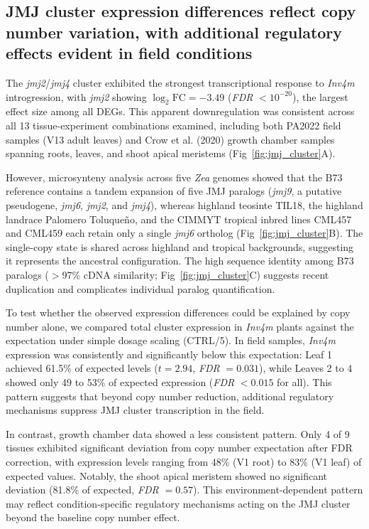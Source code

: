 \documentclass[9pt,twocolumn,twoside]{rilabRxiv}
\newcommand{\invfour}{\textit{Inv4m}\xspace}
\newcommand{\jmjii}{\textit{jmj2}\xspace}
\newcommand{\jmjiv}{\textit{jmj4}\xspace}
\newcommand{\jmjvi}{\textit{jmj6}\xspace}
\newcommand{\jmjix}{\textit{jmj9}\xspace}
\begin{document}
\subsection{JMJ cluster expression differences reflect copy number variation, with additional regulatory effects evident in field conditions}

The \jmjii/\jmjiv cluster exhibited the strongest transcriptional response to \invfour introgression, with \jmjii showing $\log_2 \text{FC} = -3.49$ (\textit{FDR} $< 10^{-20}$), the largest effect size among all DEGs.
This apparent downregulation was consistent across all 13 tissue-experiment combinations examined, including both PA2022 field samples (V13 adult leaves) and Crow et al. (2020) growth chamber samples spanning roots, leaves, and shoot apical meristems (Fig~\ref{fig:jmj_cluster}A).

However, microsynteny analysis across five \textit{Zea} genomes showed that the B73 reference contains a tandem expansion of five JMJ paralogs (\jmjix, a putative pseudogene, \jmjvi, \jmjii, and \jmjiv), whereas highland teosinte TIL18, the highland landrace Palomero Toluque\~{n}o, and the CIMMYT tropical inbred lines CML457 and CML459 each retain only a single \textit{jmj6} ortholog (Fig~\ref{fig:jmj_cluster}B).
The single-copy state is shared across highland and tropical backgrounds, suggesting it represents the ancestral configuration.
The high sequence identity among B73 paralogs ($>$97\% cDNA similarity; Fig~\ref{fig:jmj_cluster}C) suggests recent duplication and complicates individual paralog quantification.

To test whether the observed expression differences could be explained by copy number alone, we compared total cluster expression in \invfour plants against the expectation under simple dosage scaling (CTRL/5).
In field samples, \invfour expression was consistently and significantly below this expectation: Leaf 1 achieved 61.5\% of expected levels ($t = 2.94$, \textit{FDR} $= 0.031$), while Leaves 2 to 4 showed only 49 to 53\% of expected expression (\textit{FDR} $< 0.015$ for all).
This pattern suggests that beyond copy number reduction, additional regulatory mechanisms suppress JMJ cluster transcription in the field.

In contrast, growth chamber data showed a less consistent pattern.
Only 4 of 9 tissues exhibited significant deviation from copy number expectation after FDR correction, with expression levels ranging from 48\% (V1 root) to 83\% (V1 leaf) of expected values.
Notably, the shoot apical meristem showed no significant deviation (81.8\% of expected, \textit{FDR} $= 0.57$).
This environment-dependent pattern may reflect condition-specific regulatory mechanisms acting on the JMJ cluster beyond the baseline copy number effect.
\end{document}
